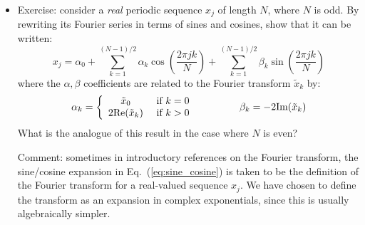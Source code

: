 \documentclass[aps,prd,superscriptaddress,groupedaddress,nofootinbib,nobibnotes]{revtex4}
\newcommand{\be}{\begin{equation}}
\newcommand{\ee}{\end{equation}}
\def\tx{{\tilde x}}
\begin{document}
\begin{itemize}
\item Exercise: consider a {\em real} periodic sequence $x_j$ of length $N$, where $N$ is odd.
 By rewriting its Fourier series in terms of sines and cosines, show that it can be written:
\be
 x_j = \alpha_0 + \sum_{k=1}^{(N-1)/2} \alpha_k \cos\left( \frac{2\pi j k}{N} \right) + \sum_{k=1}^{(N-1)/2} \beta_k \sin\left( \frac{2\pi j k}{N} \right)  \label{eq:sine_cosine}
\ee
 where the $\alpha,\beta$ coefficients are related to the Fourier transform $\tx_k$ by:
\be
\alpha_k = \left\{ \begin{array}{cl}
  \tilde x_0 & \mbox{ if $k=0$} \\
  2 \mbox{Re}(\tilde x_k) & \mbox{ if $k>0$}
\end{array} \right.
  \hspace{1.5cm}
\beta_k = -2 \mbox{Im}(\tilde x_k)
\ee
 What is the analogue of this result in the case where $N$ is even?

 Comment: sometimes in introductory references on the Fourier transform, the sine/cosine expansion in
 Eq.~(\ref{eq:sine_cosine}) is taken to be the definition of the Fourier transform for a real-valued
 sequence $x_j$.  We have chosen to define the transform as an expansion in complex exponentials,
 since this is usually algebraically simpler.

\end{itemize}



%

% 
% 

\end{document}
